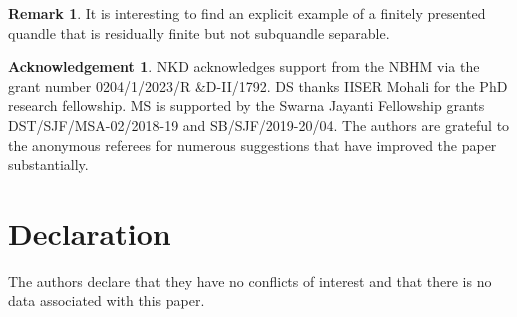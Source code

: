 \documentclass[12pt]{amsart}
\theoremstyle{definition}
\newtheorem{remark}[theorem]{Remark}
\numberwithin{equation}{subsection}
\newtheorem*{ack}{Acknowledgement}
\begin{document}
\begin{remark}
It is interesting to find an explicit example of a finitely presented quandle that is residually finite but not subquandle separable.
\end{remark}

\begin{ack}
NKD acknowledges support from the NBHM via the grant number 0204/1/2023/R \&D-II/1792. DS thanks IISER Mohali for the PhD research fellowship. MS is supported by the Swarna Jayanti Fellowship grants DST/SJF/MSA-02/2018-19 and SB/SJF/2019-20/04. The authors are grateful to the anonymous referees for numerous suggestions that have improved the paper substantially.
\end{ack}

\section{Declaration}
The authors declare that they have no conflicts of interest and that there is no data associated with this paper.
\end{document}
